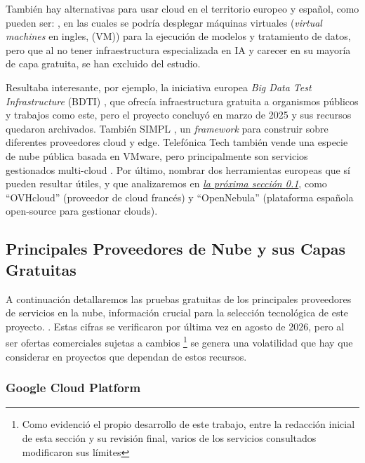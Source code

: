 También hay alternativas para usar cloud en el territorio europeo y español, como pueden ser: \citep{cloudingIO, nextcloudCloud, gigasCloud}, en las cuales se podría desplegar máquinas virtuales (\textit{virtual machines} en ingles, (VM)) para la ejecución de modelos y tratamiento de datos, pero que al no tener infraestructura especializada en IA y carecer en su mayoría de capa gratuita, se han excluido del estudio.

Resultaba interesante, por ejemplo, la iniciativa europea \textit{Big Data Test Infrastructure} (BDTI) \citep{BDTIEuropeProject, GobEspana2021BDTI}, que ofrecía infraestructura gratuita a organismos públicos y trabajos como este, pero el proyecto concluyó en marzo de 2025 y sus recursos quedaron archivados. También SIMPL \citep{SIMPLEuropeProject}, un \textit{framework} para construir sobre diferentes proveedores cloud y edge. Telefónica Tech también vende una especie de nube pública basada en VMware, pero principalmente son servicios gestionados multi-cloud \citep{TelefonicaTechCloudPlatform}. Por último, nombrar dos herramientas europeas que sí pueden resultar útiles, y que analizaremos en \hyperref[sec:cloud-free-tiers]{\textit{la próxima sección \ref*{sec:cloud-free-tiers}}}, como ``OVHcloud'' (proveedor de cloud francés) y ``OpenNebula'' (plataforma española open-source para gestionar clouds). \\


\subsection{Principales Proveedores de Nube y sus Capas Gratuitas}
\label{sec:cloud-free-tiers}

A continuación detallaremos las pruebas gratuitas de los principales proveedores de servicios en la nube, información crucial para la selección tecnológica de este proyecto. \citep{free-for-dev}. Estas cifras se verificaron por última vez en agosto de 2026, pero al ser ofertas comerciales sujetas a cambios \footnote{Como evidenció el propio desarrollo de este trabajo, entre la redacción inicial de esta sección y su revisión final, varios de los servicios consultados modificaron sus límites} se genera una volatilidad que hay que considerar en proyectos que dependan de estos recursos.

\subsubsection*{Google Cloud Platform}

